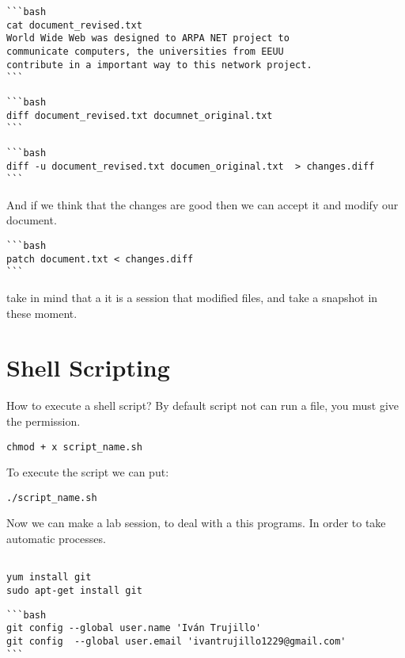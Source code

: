 \documentclass[10pt,a4paper]{article}
\begin{document}
\begin{verbatim}
```bash
cat document_revised.txt
World Wide Web was designed to ARPA NET project to
communicate computers, the universities from EEUU 
contribute in a important way to this network project.
```
\end{verbatim}




\begin{verbatim}
```bash
diff document_revised.txt documnet_original.txt
```
\end{verbatim}

\begin{verbatim}
```bash
diff -u document_revised.txt documen_original.txt  > changes.diff
``` 
\end{verbatim}
And if we think that the changes are good then we can accept it and modify our document.

\begin{verbatim}
```bash
patch document.txt < changes.diff
```
\end{verbatim}

take in mind that a  it is a session that modified files, and take a snapshot in these moment.


\section{Shell Scripting}
How to execute a shell script?
By default script not can run a file, you must give the permission.

\begin{verbatim}
chmod + x script_name.sh
\end{verbatim}

To execute the script we can put:
\begin{verbatim}
./script_name.sh
\end{verbatim}
	
Now we can make a lab session, to deal with a this programs.
In order to take automatic processes. 	




\begin{verbatim}

yum install git
sudo apt-get install git
\end{verbatim}


\begin{verbatim}
```bash
git config --global user.name 'Iván Trujillo'
git config  --global user.email 'ivantrujillo1229@gmail.com'
```
\end{verbatim}
\end{document}
